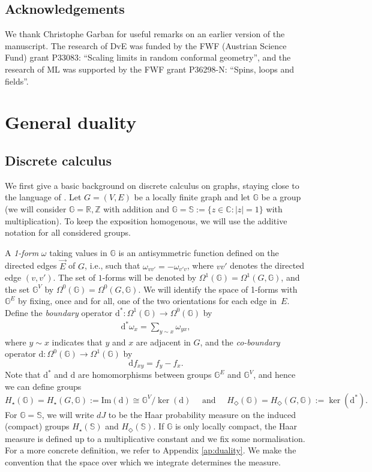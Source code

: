 \documentclass[11pt, reqno]{amsart}
\numberwithin{equation}{section}
\theoremstyle{definition}
\theoremstyle{remark}
\newcommand{\ZZ}{\mathbb{Z}}
\newcommand{\RR}{\mathbb{R}}
\renewcommand{\d}{\mathrm{d}}
\newcommand{\Group}{{\ensuremath{\mathbb{G}}}}
\newcommand{\J}{J}
\newcommand{\Hcycle}{\ensuremath{H_{\star}}}
\newcommand{\Hstar}{\ensuremath{H_{\Diamond}} }
\begin{document}
 
 \subsection*{Acknowledgements} We thank Christophe Garban for useful remarks on an earlier version of the manuscript.
 The research of DvE was funded by the FWF (Austrian Science Fund) grant P33083: “Scaling limits in random conformal geometry”, and the research of ML
was supported by the FWF grant P36298-N: ``Spins, loops and fields''.
 

\section{General duality}\label{sec:gendual}

\subsection{Discrete calculus}
We first give a basic background on discrete calculus on graphs, 
staying close to the language of \cite{LyPer}. 
Let $G = (V, E)$ be a locally finite graph and let $\Group$ be a group (we will consider $\Group= \RR, \ZZ$ with addition and $\Group= \mathbb{S}:=\{z\in \mathbb C: |z|=1\}$ with multiplication). 
To keep the exposition homogenous, we will use the additive notation for all considered groups.

A \emph{1-form} $\omega$ taking values in $\Group$ is an antisymmetric function defined on the directed edges $\vec E$ of $G$, 
i.e., such that $\omega_{vv'}= -\omega_{v'v}$, where $vv'$ denotes the directed edge $(v,v')$. The set of $1$-forms will be denoted by $\Omega^1(\Group) = \Omega^1( G,\Group)$, and the set $\mathbb G^V$ by $\Omega^0(\Group) = \Omega^0(G, \Group)$. 
We will identify the space of 1-forms with $\mathbb \Group^E$ by fixing, once and for all, one of the two orientations for each edge in~$E$. 
Define the \emph{boundary} operator $\d^*: \Omega^1(\Group) \to \Omega^0(\Group)$ by 
\begin{align*}
	\d^*\omega_x = \sum_{y\sim x} \omega_{yx},
\end{align*}
where $y\sim x$ indicates that $y$ and $x$ are adjacent in $G$, and the \emph{co-boundary} operator $\d: \Omega^0(\Group) \to \Omega^1(\Group)$ by
\[	
\d f_{xy} = f_y - f_x.
\]
Note that $\d^*$ and $\d$ are homomorphisms between groups $\mathbb G^E$ and $\mathbb G^V$, and hence we can define groups
\[
\Hcycle(\Group) = \Hcycle(G,\Group):= \mathrm{Im}(\d) \cong \Group^V / \ker(\d) \quad \text{ and } \quad \Hstar(\Group) =  \Hstar(G,\Group) :=\ker(\d^*).
\]
For $\Group=\mathbb S$, we will write $d \J$ to be the Haar probability measure on the induced (compact) groups $\Hcycle(\mathbb S)$ and $\Hstar(\mathbb S)$. 
If $\Group$ is only locally compact, the Haar measure is defined up to a multiplicative constant and we fix some normalisation. 
For a more concrete definition, we refer to Appendix \ref{ap:duality}. 
We make the convention that the space over which we integrate determines the measure. 
\end{document}

